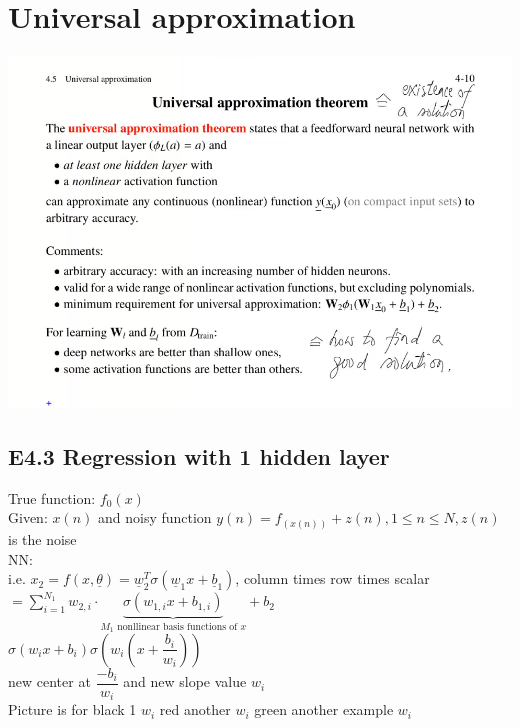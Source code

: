 \section{Universal approximation } 
\includegraphics[width=\linewidth]{Images/Slide410.png}

\subsection{E4.3 Regression with 1 hidden layer}
True function: $ f_0(x)   $\\
Given: $ x(n)  $ and noisy function $ y(n) = f_(x(n)) + z(n) , 1 \leq n \leq N  ,z(n)$ is the noise \\
NN: \\
i.e. $  x_2 = f(x, \underline{\theta}) = \underline{w}_2^T \sigma ( \underline{w}_1 x + \underline{b}_1 )  $, column times row times scalar \\
$ = \sum_{i=1}^{N_1} w_{2,i} \cdot \underbrace{\sigma ( w_{1,i} x + b_{1,i}) }_{M_1 \text{ nonllinear basis functions of }x} + b_2$ \\
$ \sigma ( w_i x + b_i ) \sigma (w_i ( x + \dfrac{b_i}{w_i})) $ \\
new center at $ \dfrac{-b_i}{w_i} $ and new slope value $ w_i $ \\
Picture is for black 1 $ w_i $ red another $ w_i $ green another example $ w_i $\\
